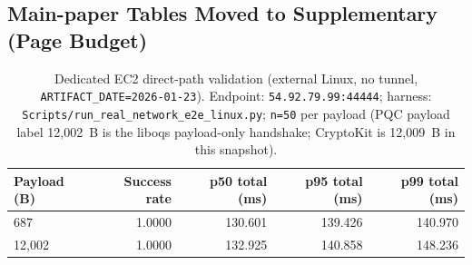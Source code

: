 \documentclass[10pt,journal,compsoc]{IEEEtran}
\begin{document}
\onecolumn
	
\subsection*{Main-paper Tables Moved to Supplementary (Page Budget)}











	










\begin{table}[!tp]
\centering
\scriptsize
\caption{Dedicated EC2 direct-path validation (external Linux, no tunnel, \texttt{ARTIFACT\_DATE=2026-01-23}). Endpoint: \texttt{54.92.79.99:44444}; harness: \texttt{Scripts/run\_real\_network\_e2e\_linux.py}; \texttt{n=50} per payload (PQC payload label 12{,}002~B is the liboqs payload-only handshake; CryptoKit is 12{,}009~B in this snapshot).}
\label{tab:supp-ec2-direct}
\begin{tabular}{@{}lrrrr@{}}
\toprule
Payload (B) & Success rate & p50 total (ms) & p95 total (ms) & p99 total (ms) \\
\midrule
687   & 1.0000 & 130.601 & 139.426 & 140.970 \\
12{,}002 & 1.0000 & 132.925 & 140.858 & 148.236 \\
\bottomrule
\end{tabular}
\end{table}
\end{document}
